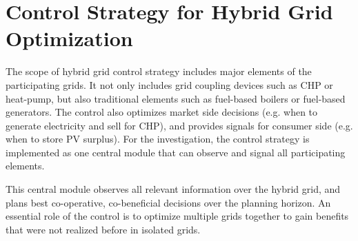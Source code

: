 \documentclass[review]{elsarticle}
\begin{document}
\section{Control Strategy for Hybrid Grid Optimization} 
\label{sec:control}

The scope of hybrid grid control strategy includes major elements
of the participating grids. It not only includes grid coupling
devices such as CHP or heat-pump, but also traditional
elements such as fuel-based boilers or fuel-based generators. The
control also optimizes market side decisions (e.g. when to
generate electricity and sell for CHP), and provides signals for
consumer side (e.g. when to store PV surplus).    
For the investigation, the control strategy is implemented as one
central module that can observe and signal all participating
elements.
 
This central module observes all relevant information over the 
hybrid grid, and plans best co-operative, co-beneficial decisions over
the planning horizon. 
An essential role of the control is to optimize multiple grids
together to gain benefits that were not realized before in isolated
grids.   
\end{document}
